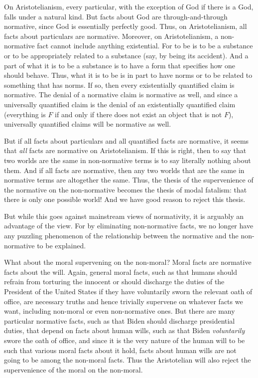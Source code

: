 On Aristotelianism, every particular, with the exception of God if there is a God, falls under a natural kind.
But facts about God are through-and-through normative, since God is essentially perfectly good. Thus,
on Aristotelianism, all facts about particulars are normative. 
Moreover, on Aristotelianism, a non-normative fact cannot include anything existential.
For to be is to be a substance or to be appropriately related to a substance (say, by being its accident).
And a part of what it is to be a substance is to have a form that specifies how one should behave. Thus,
what it is to be is in part to have norms or to be related to something that has norms. If so, then every
existentially quantified claim is normative. The denial of a normative claim is normative as well, and
since a universally quantified claim is the denial of an existentially quantified claim (everything is
$F$ if and only if there does not exist an object that is not $F$), universally quantified claims 
will be normative as well. 

But if all facts about particulars and all quantified facts are normative, it seems that \textit{all} facts
are normative on Aristotelianism.  If this is right, then to say that two worlds are the same in non-normative terms 
is to say literally nothing about them. And if all facts are normative, then any two worlds that are the same
in normative terms are altogether the same. Thus, the thesis of the supervenience of the normative on the
non-normative becomes the thesis of modal fatalism: that there is only one possible world! And we have good
reason to reject this thesis.

But while this goes against mainstream views of normativity, it is arguably an advantage of the
view. For by eliminating non-normative facts, we no longer have any puzzling phenomenon of the relationship 
between the normative and the non-normative to be explained. 

What about the moral supervening on the non-moral? Moral facts are normative facts about the
will. Again, general moral facts, such as that humans should refrain from torturing the innocent or should
discharge the duties of the President of the United States if they have voluntarily sworn the
relevant oath of office,
are necessary truths and hence trivially supervene on whatever facts we want, including
non-moral or even non-normative ones. But there are many particular normative facts, such as
that Biden should discharge presidential duties, that depend on facts about human wills,
such as that Biden \textit{voluntarily} swore the oath of office, and since it is the very nature
of the
human will to be such that various moral facts about it hold, facts about human wills are not going
to be among the non-moral facts. Thus the Aristotelian will also reject the supervenience of the
moral on the non-moral.

